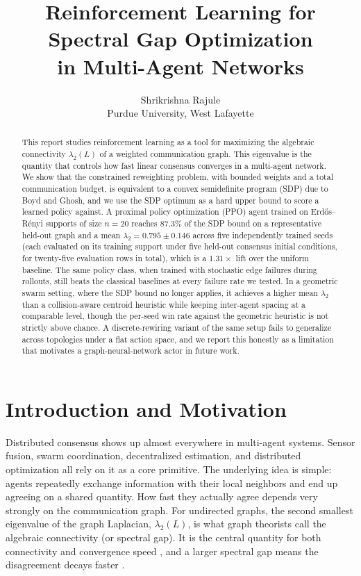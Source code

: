 \documentclass[letterpaper, 11 pt, journal, twoside]{IEEEtran}
\title{Reinforcement Learning for Spectral Gap Optimization\\ in Multi-Agent Networks}
\author{Shrikrishna Rajule\\
Purdue University, West Lafayette}
\begin{document}
\maketitle

\begin{abstract}
This report studies reinforcement learning as a tool for maximizing
the algebraic connectivity $\lambda_2(L)$ of a weighted communication
graph. This eigenvalue is the quantity that controls how fast linear
consensus converges in a multi-agent network. We show that the
constrained reweighting problem, with bounded weights and a total
communication budget, is equivalent to a convex semidefinite program
(SDP) due to Boyd and Ghosh, and we use the SDP optimum as a hard
upper bound to score a learned policy against. A proximal policy
optimization (PPO) agent trained on Erd\H{o}s--R\'enyi supports of
size $n=20$ reaches $87.3\%$ of the SDP bound on a representative
held-out graph and a mean $\lambda_2 = 0.795 \pm 0.146$ across five
independently trained seeds (each evaluated on its training support
under five held-out consensus initial conditions, for twenty-five
evaluation rows in total), which is a $1.31\times$ lift over the
uniform baseline. The same policy class, when trained with stochastic
edge failures during rollouts, still beats the classical baselines at
every failure rate we tested. In a geometric swarm setting, where the
SDP bound no longer applies, it achieves a higher mean
$\lambda_2$ than a collision-aware centroid heuristic while keeping
inter-agent spacing at a comparable level, though the per-seed win
rate against the geometric heuristic is not strictly above chance. A
discrete-rewiring variant of the same setup fails to generalize
across topologies under a flat action space, and we report this
honestly as a limitation that motivates a graph-neural-network actor
in future work.
\end{abstract}

\section{Introduction and Motivation}
\label{sec:intro}
Distributed consensus shows up almost everywhere in multi-agent
systems. Sensor fusion, swarm coordination, decentralized estimation,
and distributed optimization all rely on it as a core primitive. The
underlying idea is simple: agents repeatedly exchange information
with their local neighbors and end up agreeing on a shared quantity.
How fast they actually agree depends very strongly on the
communication graph. For undirected graphs, the second smallest
eigenvalue of the graph Laplacian, $\lambda_2(L)$, is what graph
theorists call the algebraic connectivity (or spectral gap). It is
the central quantity for both connectivity and convergence speed
\cite{Fiedler1973,OlfatiSaber2007,RenBeard2005}, and a larger
spectral gap means the disagreement decays faster
\cite{Olshevsky2009}.
\end{document}
